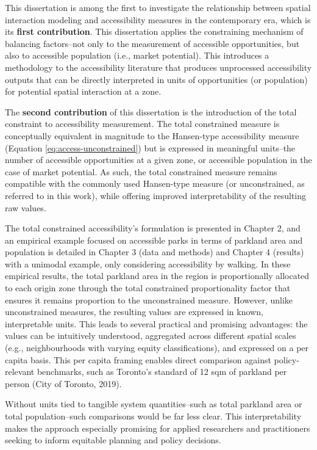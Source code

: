 \documentclass[
11pt, %
oneside, %
english, %
singlespacing, %
]{macthesis} %
\begin{document}
This dissertation is among the first to investigate the relationship between spatial interaction modeling and accessibility measures in the contemporary era, which is its \textbf{first contribution}. This dissertation applies the constraining mechanism of balancing factors--not only to the measurement of accessible opportunities, but also to accessible population (i.e., market potential). This introduces a methodology to the accessibility literature that produces unprocessed accessibility outputs that can be directly interpreted in units of opportunities (or population) for potential spatial interaction at a zone.

The \textbf{second contribution} of this dissertation is the introduction of the total constraint to accessibility measurement. The total constrained measure is conceptually equivalent in magnitude to the Hansen-type accessibility measure (Equation \ref{eq:access-unconstrained}) but is expressed in meaningful units--the number of accessible opportunities at a given zone, or accessible population in the case of market potential. As such, the total constrained measure remains compatible with the commonly used Hansen-type measure (or unconstrained, as referred to in this work), while offering improved interpretability of the resulting raw values.

The total constrained accessibility's formulation is presented in Chapter 2, and an empirical example focused on accessible parks in terms of parkland area and population is detailed in Chapter 3 (data and methods) and Chapter 4 (results) with a unimodal example, only considering accessibility by walking. In these empirical results, the total parkland area in the region is proportionally allocated to each origin zone through the total constrained proportionality factor that ensures it remains proportion to the unconstrained measure. However, unlike unconstrained measures, the resulting values are expressed in known, interpretable units. This leads to several practical and promising advantages: the values can be intuitively understood, aggregated across different spatial scales (e.g., neighbourhoods with varying equity classifications), and expressed on a per capita basis. This per capita framing enables direct comparison against policy-relevant benchmarks, such as Toronto's standard of 12 sqm of parkland per person (City of Toronto, 2019).

Without units tied to tangible system quantities--such as total parkland area or total population--such comparisons would be far less clear. This interpretability makes the approach especially promising for applied researchers and practitioners seeking to inform equitable planning and policy decisions.
\end{document}
